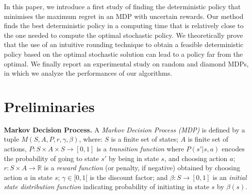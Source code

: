 \documentclass[sigconf]{aamas}  %
\begin{document}
In this paper, we introduce a first study of finding the deterministic policy that minimises the maximum regret in an MDP with uncertain rewards. Our method finds the best deterministic policy in a computing time that is relatively close to the one needed to compute the optimal stochastic policy. 
We theoretically prove that the use of an intuitive rounding technique to obtain a feasible deterministic policy based on the optimal stochastic solution can lead to a policy far from the optimal. 
We finally report an experimental study on random and diamond MDPs, in which we analyze the performances of our algorithms. 



\section{Preliminaries}\label{sec:Preliminaries}

\textbf{Markov Decision Process.}  
A \textit{Markov Decision Process (MDP)} \citep{Puterman1994} is defined by a tuple $M(S, A, P, r, \gamma, \beta)$, where: $S$ is a finite set of states; $A$ is finite set of actions, $P: S \times A \times S \longrightarrow [0,1]$ is a \textit{transition function} where $P(s'|s,a)$ encodes the probability of going to state $s'$ by being in state $s$, and choosing action $a$; $r: S \times A \longrightarrow \mathbb{R}$ is a \textit{reward function} (or penalty, if negative) obtained by choosing action $a$ in state $s$; $\gamma \in [0, 1[$ is the discount factor; and $\beta: S \longrightarrow [0,1]$ is an \textit{initial state distribution function} indicating probability of initiating in state $s$ by $\beta(s)$.
\end{document}
